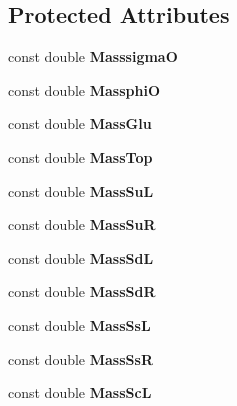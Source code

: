 \subsection*{Protected Attributes}
\begin{DoxyCompactItemize}
\item 
\mbox{\label{classMRSSM_a7b4710a7a57255e9901935edbbf78ec4}} 
const double {\bfseries MasssigmaO}
\item 
\mbox{\label{classMRSSM_ac29fb0344519ace1517006a8a0e976b9}} 
const double {\bfseries MassphiO}
\item 
\mbox{\label{classMRSSM_a64d0f4a9a892e39c6c5e621415b798d6}} 
const double {\bfseries Mass\+Glu}
\item 
\mbox{\label{classMRSSM_a3246523a0f6aee64e351050e69b5809c}} 
const double {\bfseries Mass\+Top}
\item 
\mbox{\label{classMRSSM_aa1760b2961db89e6de0ca6dc009f8408}} 
const double {\bfseries Mass\+SuL}
\item 
\mbox{\label{classMRSSM_a509514932bc269192aad80eb334f23de}} 
const double {\bfseries Mass\+SuR}
\item 
\mbox{\label{classMRSSM_a14346aebba69de118194328c4b9e63f8}} 
const double {\bfseries Mass\+SdL}
\item 
\mbox{\label{classMRSSM_aa0abffb21c05ad2576f6363089cc87af}} 
const double {\bfseries Mass\+SdR}
\item 
\mbox{\label{classMRSSM_a876d5e9376a4d9d148e2acba28ee7064}} 
const double {\bfseries Mass\+SsL}
\item 
\mbox{\label{classMRSSM_ae74e9ef756b9652e732327ffad1e7f46}} 
const double {\bfseries Mass\+SsR}
\item 
\mbox{\label{classMRSSM_aca2ef837460d4de9e176759ca0300eb2}} 
const double {\bfseries Mass\+ScL}
\item 
\mbox{\label{classMRSSM_acc25487cacdae102618670a9efe7d1fc}} 

\end{DoxyCompactItemize}
